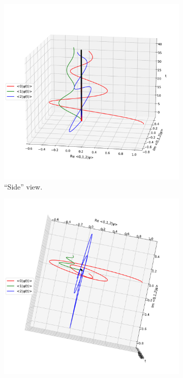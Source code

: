 %
\begin{figure}[]
  \begin{subfigure}[b]{\textwidth}
    \centering
    \includegraphics[height=0.41\textheight,clip,trim=0 90 40 140]{img/3ldetect/NonHermitianSpaceTime_side.pdf}
    \caption{``Side'' view.}
  \end{subfigure}
  \par\bigskip
  \begin{subfigure}[b]{\textwidth}
    \centering
    \includegraphics[height=0.44\textheight,clip,trim= 0 90 20 75]{img/3ldetect/NonHermitianSpaceTime_top.pdf}

\end{subfigure}
\end{figure}
